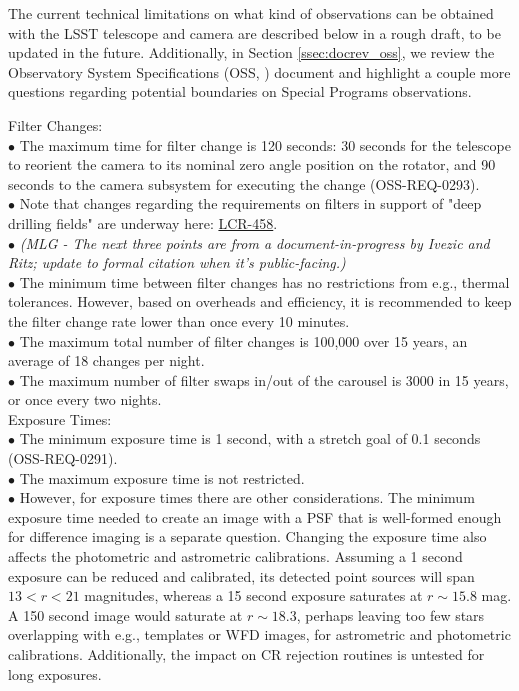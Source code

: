 \documentclass[DM,lsstdraft,toc]{lsstdoc}
\begin{document}
The current technical limitations on what kind of observations can be obtained with the LSST telescope and camera are described below in a rough draft, to be updated in the future. Additionally, in Section \ref{ssec:docrev_oss}, we review the Observatory System Specifications (OSS, ) document and highlight a couple more questions regarding potential boundaries on Special Programs observations.

Filter Changes: \\
$\bullet$ The maximum time for filter change is 120 seconds: 30 seconds for the telescope to reorient the camera to its nominal zero angle position on the rotator, and 90 seconds to the camera subsystem for executing the change (OSS-REQ-0293). \\
$\bullet$ Note that changes regarding the requirements on filters in support of "deep drilling fields" are underway here: \href{https://project.lsst.org/groups/ccb/node/938}{LCR-458}. \\
$\bullet$ \textit{(MLG - The next three points are from a document-in-progress by Ivezic and Ritz; update to formal citation when it's public-facing.)} \\
$\bullet$ The minimum time between filter changes has no restrictions from e.g., thermal tolerances. However, based on overheads and efficiency, it is recommended to keep the filter change rate lower than once every 10 minutes. \\
$\bullet$ The maximum total number of filter changes is 100,000 over 15 years, an average of 18 changes per night. \\
$\bullet$ The maximum number of filter swaps in/out of the carousel is 3000 in 15 years, or once every two nights. \\

Exposure Times: \\
$\bullet$ The minimum exposure time is 1 second, with a stretch goal of 0.1 seconds (OSS-REQ-0291). \\
$\bullet$ The maximum exposure time is not restricted. \\
$\bullet$ However, for exposure times there are other considerations. The minimum exposure time needed to create an image with a PSF that is well-formed enough for difference imaging is a separate question. Changing the exposure time also affects the photometric and astrometric calibrations. Assuming a 1 second exposure can be reduced and calibrated, its detected point sources will span $13 < r < 21$ magnitudes, whereas a 15 second exposure saturates at $r\sim15.8$ mag. A 150 second image would saturate at $r\sim18.3$, perhaps leaving too few stars overlapping with e.g., templates or WFD images, for astrometric and photometric calibrations. Additionally, the impact on CR rejection routines is untested for long exposures.
\end{document}
